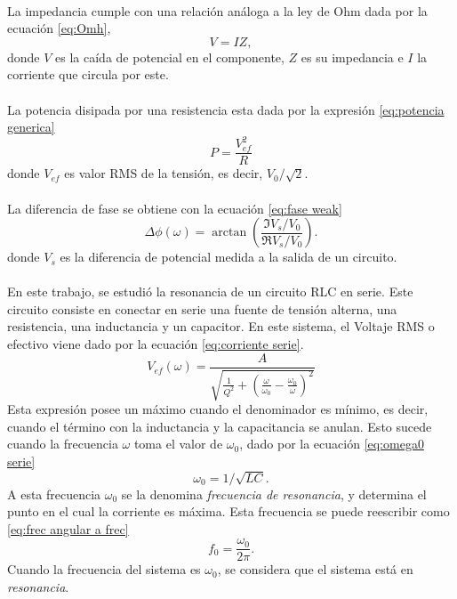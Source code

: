 \paragraph{}
La impedancia cumple con una relación análoga a la ley de Ohm dada por la ecuación \ref{eq:Omh},
\begin{equation}\label{eq:Omh}
    V = IZ ,
\end{equation}
donde $V$ es la caída de potencial en el componente, $Z$ es su impedancia e $I$ la corriente que circula por este. 
\paragraph{}
La potencia disipada por una resistencia esta dada por la expresión \eqref{eq:potencia generica}
\begin{equation}\label{eq:potencia generica}
    P=\frac{V_{ef}^2}{R}
\end{equation}
donde $V_{ef}$ es valor RMS de la tensión, es decir, $V_0/\sqrt{2}$.
\paragraph{}
La diferencia de fase se obtiene con la ecuación \eqref{eq:fase weak}
\begin{equation}\label{eq:fase weak}
    \Delta\phi(\omega) = \arctan \left( \frac{\Im V_{s}/V_{0}}{\Re V_{s}/V_{0}}\right).
\end{equation}
donde $V_s$ es la diferencia de potencial medida a la salida de un circuito.
\paragraph{}
En este trabajo, se estudió la resonancia de un circuito RLC en serie. Este circuito consiste en conectar en serie una fuente de tensión alterna, una resistencia, una inductancia y un capacitor. En este sistema, el Voltaje RMS o efectivo viene dado por la ecuación \eqref{eq:corriente serie}\cite{apunte_guia3}.
\begin{equation}\label{eq:corriente serie}
V_{ef}(\omega) = \frac{A}{\sqrt{\frac{1}{Q^2} + (\frac{\omega}{\omega_0} - \frac{\omega_0}{\omega})^2}}
\end{equation}
Esta expresión posee un máximo cuando el denominador es mínimo, es decir, cuando el término con la inductancia y la capacitancia se anulan. Esto sucede cuando la frecuencia $\omega$ toma el valor de $\omega_0$, dado por la ecuación \eqref{eq:omega0 serie}\cite{apunte_guia3}
\begin{equation}\label{eq:omega0 serie}
    \omega_0=1/\sqrt{LC}.
\end{equation}
A esta frecuencia $\omega_0$ se la denomina \emph{frecuencia de resonancia}, y determina el punto en el cual la corriente es máxima. Esta frecuencia se puede reescribir como \eqref{eq:frec angular a frec}
\begin{equation}\label{eq:frec angular a frec}
    f_0=\frac{\omega_0}{2\pi}.
\end{equation}
Cuando la frecuencia del sistema es $\omega_0$, se considera que el sistema está en \emph{resonancia}.
